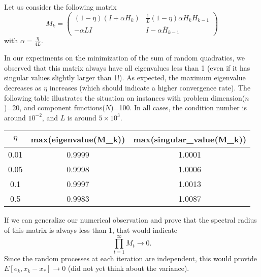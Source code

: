 \documentclass{article}
\begin{document}
 
\noindent 
Let us consider the following matrix
\[
 M_k = \begin{pmatrix} (1-\eta)(I+\alpha H_k) & \displaystyle\frac{1}{L} (1-\eta)\alpha H_k\bar H_{k-1}\\  
                   -\alpha LI  & I-\alpha\bar H_{k-1} \end{pmatrix}                  
\]
with $\alpha=\displaystyle\frac{\eta}{4L}$.

\bigskip
\noindent
In our experiments on the minimization of the sum of random quadratics, we observed that this matrix always have all eigenvalues less than 1 (even if it has singular values slightly larger than 1!).  As expected, the maximum eigenvalue decreases as $\eta$ increases (which should indicate a higher convergence rate).  The following table illustrates the situation on instances with problem dimension($n$)=20, and component functions($N$)=100.  In all cases, the condition number is around $10^{-2}$, and $L$ is around $5\times 10^3$.
\begin{center}
\begin{tabular}{ccc}
 \hline
 $\eta$ & max(eigenvalue(M\_k)) & max(singular\_value(M\_k)) \\
 \hline
 0.01 & 0.9999 & 1.0001 \\
 0.05 & 0.9998 & 1.0006 \\
 0.1 & 0.9997 & 1.0013 \\
 0.5 & 0.9983 & 1.0087 \\
 \hline
\end{tabular}
\end{center}

\bigskip

If we can generalize our numerical observation and prove that the spectral radius of this matrix is always less than 1, that would indicate 
\[
\prod_{t=1}^\infty M_t \rightarrow 0. 
\]
Since the random processes at each iteration are independent, this would provide $E[e_k, x_k-x_\ast]\rightarrow 0$ (did not yet think about the variance).


\bigskip
\end{document}
